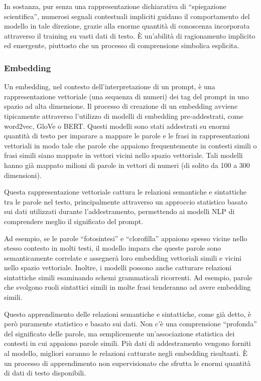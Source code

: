             In sostanza, pur senza una rappresentazione dichiarativa di ``spiegazione scientifica'', numerosi segnali contestuali impliciti guidano il comportamento del modello in tale direzione, grazie alla enorme quantità di conoscenza incorporata attraverso il training su vasti dati di testo. È un'abilità di ragionamento implicito ed emergente, piuttosto che un processo di comprensione simbolica esplicita.
            
        \subsubsection{Embedding}
            Un embedding, nel contesto dell'interpretazione di un prompt, è una rappresentazione vettoriale (una sequenza di numeri) dei tag del prompt in uno spazio ad alta dimensione. Il processo di creazione di un embedding avviene tipicamente attraverso l'utilizzo di modelli di embedding pre-addestrati, come word2vec, GloVe o BERT. Questi modelli sono stati addestrati su enormi quantità di testo per imparare a mappare le parole e le frasi in rappresentazioni vettoriali in modo tale che parole che appaiono frequentemente in contesti simili o frasi simili siano mappate in vettori vicini nello spazio vettoriale. Tali modelli hanno già mappato milioni di parole in vettori di numeri (di solito da 100 a 300 dimensioni).

            Questa rappresentazione vettoriale cattura le relazioni semantiche e sintattiche tra le parole nel testo, principalmente attraverso un approccio statistico basato sui dati utilizzati durante l'addestramento, permettendo ai modelli NLP di comprendere meglio il significato del prompt.
            
            Ad esempio, se le parole ``fotosintesi'' e ``clorofilla'' appaiono spesso vicine nello stesso contesto in molti testi, il modello impara che queste parole sono semanticamente correlate e assegnerà loro embedding vettoriali simili e vicini nello spazio vettoriale. Inoltre, i modelli possono anche catturare relazioni sintattiche simili esaminando schemi grammaticali ricorrenti. Ad esempio, parole che svolgono ruoli sintattici simili in molte frasi tenderanno ad avere embedding simili.
            
            Questo apprendimento delle relazioni semantiche e sintattiche, come già detto, è però puramente statistico e basato sui dati. Non c'è una comprensione ``profonda'' del significato delle parole, ma semplicemente un'associazione statistica dei contesti in cui appaiono parole simili. Più dati di addestramento vengono forniti al modello, migliori saranno le relazioni catturate negli embedding risultanti. È un processo di apprendimento non supervisionato che sfrutta le enormi quantità di dati di testo disponibili.
            
